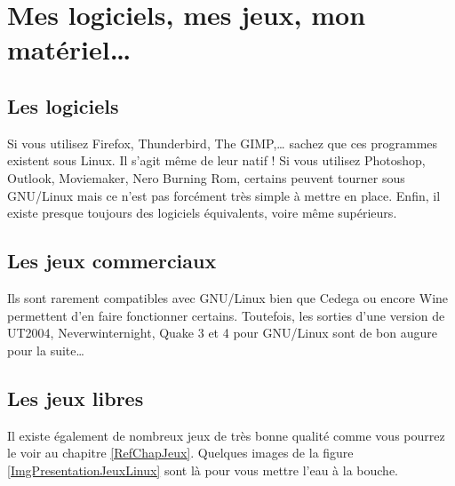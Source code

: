 \section{Mes logiciels, mes jeux, mon matériel\ldots{}}
\subsection{Les logiciels}
Si vous utilisez Firefox, Thunderbird, The GIMP,\ldots{} sachez que ces programmes existent sous Linux. Il s'agit même de leur  natif ! Si vous utilisez Photoshop, Outlook, Moviemaker, Nero Burning Rom, certains peuvent tourner sous GNU/Linux mais ce n'est pas forcément très simple à mettre en place. Enfin, il existe presque toujours des logiciels équivalents, voire même supérieurs.
\subsection{Les jeux commerciaux}
Ils sont rarement compatibles avec GNU/Linux bien que Cedega ou encore Wine permettent d'en faire fonctionner certains. Toutefois, les sorties d'une version de UT2004, Neverwinternight, Quake 3 et 4 pour GNU/Linux sont de bon augure pour la suite\ldots{}\par
\subsection{Les jeux libres}
Il existe également de nombreux jeux  de très bonne qualité comme vous pourrez le voir au chapitre \ref{RefChapJeux}. Quelques images de la figure \ref{ImgPresentationJeuxLinux} sont là pour vous mettre l'eau à la bouche.
\PresentationJeux
